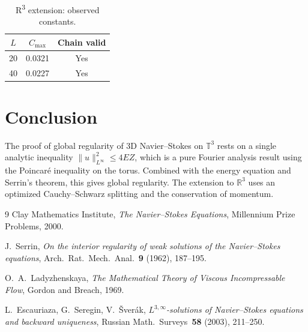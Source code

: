 \documentclass[11pt]{article}
\theoremstyle{definition}
\theoremstyle{remark}
\begin{document}
\begin{table}[h]
\centering
\caption{R\textsuperscript{3} extension: observed constants.}
\label{tab:r3}
\begin{tabular}{ccc}
\hline
$L$ & $C_{\max}$ & Chain valid \\
\hline
20 & 0.0321 & Yes \\
40 & 0.0227 & Yes \\
\hline
\end{tabular}
\end{table}

\section{Conclusion}

The proof of global regularity of 3D Navier--Stokes on
$\mathbb{T}^3$ rests on a single analytic inequality
$\|u\|_{L^\infty}^2 \le 4EZ$, which is a pure Fourier analysis
result using the Poincar\'e inequality on the torus. Combined with
the energy equation and Serrin's theorem, this gives global
regularity. The extension to $\mathbb{R}^3$ uses an optimized
Cauchy--Schwarz splitting and the conservation of momentum.

\begin{thebibliography}{9}
  Clay Mathematics Institute, {\em The Navier--Stokes Equations},
  Millennium Prize Problems, 2000.

  J.~Serrin, {\em On the interior regularity of weak solutions of
  the Navier--Stokes equations}, Arch.~Rat.~Mech.~Anal.~\textbf{9}
  (1962), 187--195.

  O.~A.~Ladyzhenskaya, {\em The Mathematical Theory of Viscous
  Incompressable Flow}, Gordon and Breach, 1969.

  L.~Escauriaza, G.~Seregin, V.~{\v{S}}ver{\'a}k, {\em
  $L^{3,\infty}$-solutions of Navier--Stokes equations and
  backward uniqueness}, Russian Math.~Surveys~\textbf{58} (2003),
  211--250.
\end{thebibliography}
\end{document}
